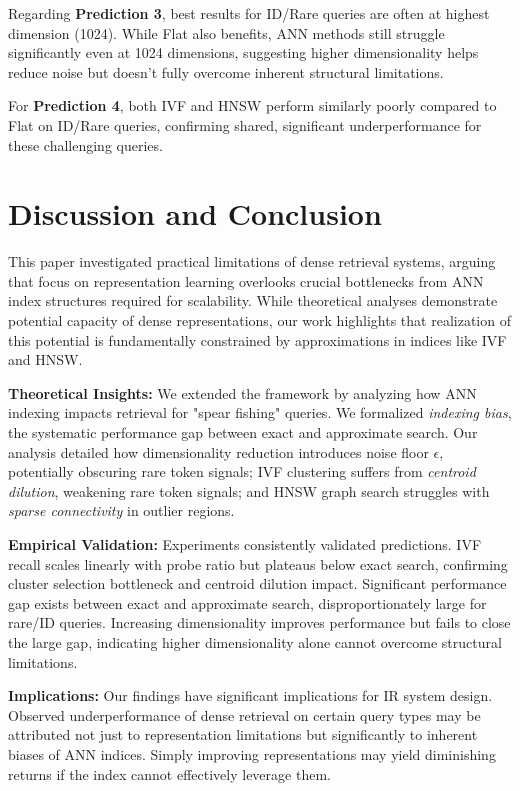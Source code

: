 \documentclass[conference,anonymous]{IEEEtran}
\begin{document}
Regarding \textbf{Prediction 3}, best results for ID/Rare queries are often at highest dimension (1024). While Flat also benefits, ANN methods still struggle significantly even at 1024 dimensions, suggesting higher dimensionality helps reduce noise but doesn't fully overcome inherent structural limitations.

For \textbf{Prediction 4}, both IVF and HNSW perform similarly poorly compared to Flat on ID/Rare queries, confirming shared, significant underperformance for these challenging queries.

\section{Discussion and Conclusion}

This paper investigated practical limitations of dense retrieval systems, arguing that focus on representation learning overlooks crucial bottlenecks from ANN index structures required for scalability. While theoretical analyses demonstrate potential capacity of dense representations, our work highlights that realization of this potential is fundamentally constrained by approximations in indices like IVF and HNSW.

\textbf{Theoretical Insights:} We extended the framework by analyzing how ANN indexing impacts retrieval for "spear fishing" queries. We formalized \textit{indexing bias}, the systematic performance gap between exact and approximate search. Our analysis detailed how dimensionality reduction introduces noise floor $\epsilon$, potentially obscuring rare token signals; IVF clustering suffers from \textit{centroid dilution}, weakening rare token signals; and HNSW graph search struggles with \textit{sparse connectivity} in outlier regions.

\textbf{Empirical Validation:} Experiments consistently validated predictions. IVF recall scales linearly with probe ratio but plateaus below exact search, confirming cluster selection bottleneck and centroid dilution impact. Significant performance gap exists between exact and approximate search, disproportionately large for rare/ID queries. Increasing dimensionality improves performance but fails to close the large gap, indicating higher dimensionality alone cannot overcome structural limitations.

\textbf{Implications:} Our findings have significant implications for IR system design. Observed underperformance of dense retrieval on certain query types may be attributed not just to representation limitations but significantly to inherent biases of ANN indices. Simply improving representations may yield diminishing returns if the index cannot effectively leverage them.
\end{document}
